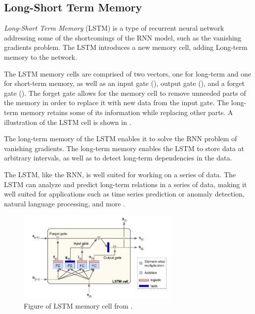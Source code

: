 \subsection{Long-Short Term Memory}
\label{section:BT:LSTM}

\textit{Long-Short Term Memory} (LSTM) is a type of recurrent neural network addressing some of the shortcomings of the RNN model,
such as the vanishing gradients problem.
The LSTM introduces a new memory cell, adding Long-term memory to the network.

The LSTM memory cells are comprised of two vectors, one for long-term and one for short-term memory,
as well as an input gate (), output gate (),
and a forget gate ().
The forget gate allows for the memory cell to remove unneeded parts of the memory in order to replace it with new data from the input gate.
The long-term memory retains some of its information while replacing other parts.
A illustration of the LSTM cell is shown in .

The long-term memory of the LSTM enables it to solve the RNN problem of vanishing gradients.
The long-term memory enables the LSTM to store data at arbitrary intervals, as well as to detect long-term dependencies in the data.

The LSTM, like the RNN, is well suited for working on a series of data.
The LSTM can analyze and predict long-term relations in a series of data, making it well suited for applications such as time series prediction or anomaly detection,
natural language processing, and more
\cite[p.~492-493]{Geron2017}.

\begin{figure}[h!]
  \centering
  \includegraphics[width=0.7\textwidth]{./sections/BT/figures/lstm_cell_hands_on.png}
  \hfill
  \caption{Figure of LSTM memory cell from \cite[p.~492]{Geron2017}.}
  \label{fig:lstm-memory-cell}
\end{figure}

